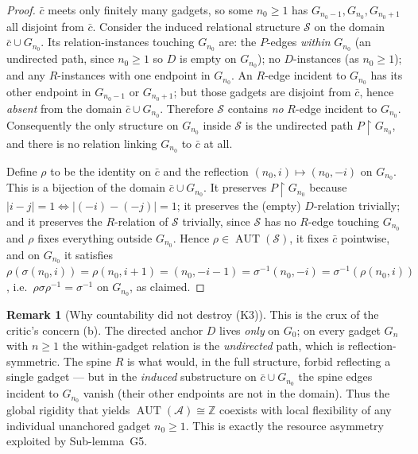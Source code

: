 \documentclass[12pt,fullpage]{article}
\theoremstyle{definition}
\newtheorem{remark}[theorem]{Remark}
\newcommand{\A}{\mathcal{A}}
\newcommand{\Z}{{\mathbb{Z}}}
\newcommand{\AUT}{\operatorname{AUT}}
\begin{document}
\begin{proof}
$\bar c$ meets only finitely many gadgets, so some $n_0\ge 1$ has
$G_{n_0-1},G_{n_0},G_{n_0+1}$ all disjoint from $\bar c$.  Consider the
induced relational structure $\mathcal{S}$ on the domain
$\bar c\cup G_{n_0}$.  Its relation-instances touching $G_{n_0}$ are:
the $P$-edges \emph{within} $G_{n_0}$ (an undirected path, since $n_0\ge1$ so
$D$ is empty on $G_{n_0}$); no $D$-instances (as $n_0\ge 1$); and any
$R$-instances with one endpoint in $G_{n_0}$.  An $R$-edge incident to
$G_{n_0}$ has its other endpoint in $G_{n_0-1}$ or $G_{n_0+1}$; but those
gadgets are disjoint from $\bar c$, hence \emph{absent} from the domain
$\bar c\cup G_{n_0}$.  Therefore $\mathcal{S}$ contains \emph{no} $R$-edge
incident to $G_{n_0}$.  Consequently the only structure on $G_{n_0}$ inside
$\mathcal{S}$ is the undirected path $P\restriction G_{n_0}$, and there is no
relation linking $G_{n_0}$ to $\bar c$ at all.

Define $\rho$ to be the identity on $\bar c$ and the reflection
$(n_0,i)\mapsto(n_0,-i)$ on $G_{n_0}$.  This is a bijection of the domain
$\bar c\cup G_{n_0}$.  It preserves $P\restriction G_{n_0}$ because
$|i-j|=1\Leftrightarrow|(-i)-(-j)|=1$; it preserves the (empty) $D$-relation
trivially; and it preserves the $R$-relation of $\mathcal{S}$ trivially, since
$\mathcal{S}$ has no $R$-edge touching $G_{n_0}$ and $\rho$ fixes everything
outside $G_{n_0}$.  Hence $\rho\in\AUT(\mathcal{S})$, it fixes $\bar c$
pointwise, and on $G_{n_0}$ it satisfies
$\rho(\sigma(n_0,i))=\rho(n_0,i+1)=(n_0,-i-1)=\sigma^{-1}(n_0,-i)=
\sigma^{-1}(\rho(n_0,i))$, i.e.\ $\rho\sigma\rho^{-1}=\sigma^{-1}$ on
$G_{n_0}$, as claimed.
\end{proof}

\begin{remark}[Why countability did not destroy (K3)]\label{rem:K3-survives}
This is the crux of the critic's concern (b).  The directed anchor $D$ lives
\emph{only} on $G_0$; on every gadget $G_n$ with $n\ge 1$ the within-gadget
relation is the \emph{undirected} path, which is reflection-symmetric.  The
spine $R$ is what would, in the full structure, forbid reflecting a single
gadget --- but in the \emph{induced} substructure on $\bar c\cup G_{n_0}$ the
spine edges incident to $G_{n_0}$ vanish (their other endpoints are not in the
domain).  Thus the global rigidity that yields $\AUT(\A)\cong\Z$ coexists with
local flexibility of any individual unanchored gadget $n_0\ge1$.  This is
exactly the resource asymmetry exploited by Sub-lemma~G5.
\end{remark}
\end{document}
